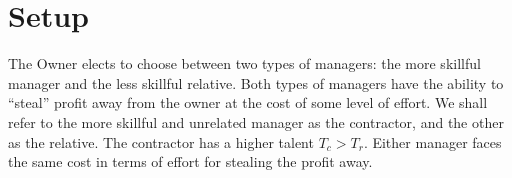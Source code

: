 \documentclass[12pt]{paper}
\begin{document}
\section{Setup}

The Owner elects to choose between two types of managers: the more
skillful manager and the less skillful relative. Both types of
managers have the ability to ``steal'' profit away from the owner at
the cost of some level of effort. We shall refer to the more skillful
and unrelated manager as the contractor, and the other as the
relative. The contractor has a higher talent $T_c > T_r$. Either
manager faces the same cost in terms of effort for stealing the profit
away.
\end{document}
